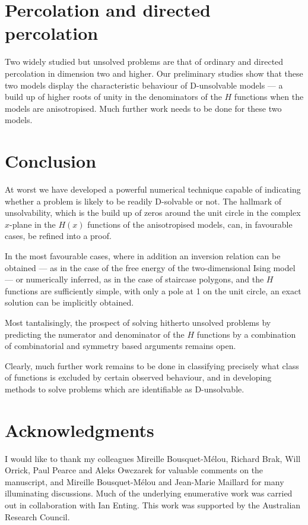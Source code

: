 \section{Percolation and directed percolation}
Two widely studied but unsolved problems are that of ordinary and
directed percolation in dimension two and higher. Our preliminary
studies \cite{JGT} show that these two models display the
characteristic behaviour of D-unsolvable models --- a build up of
higher roots of unity in the denominators of the
$H$ functions when the models
are anisotropised. Much further work needs to be done for these
two models.
\section{Conclusion}
At worst we have developed a powerful numerical technique capable
of indicating whether a problem is likely to be readily
D-solvable or not. The hallmark of unsolvability, which is
the build up of zeros around the unit circle in the
complex $x$-plane in the $H(x)$ functions of the anisotropised
models, can, in favourable cases, be refined into a proof.

In the most favourable cases, where in addition
an inversion relation can be obtained --- as in the case of
the free energy of the two-dimensional
Ising model --- or numerically inferred, as in the case of staircase
polygons, and the $H$ functions are sufficiently simple,
with only a pole at 1 on the unit circle, an exact solution
can be implicitly obtained.

Most tantalisingly, the prospect of solving hitherto unsolved
problems by predicting the numerator and denominator of the
$H$ functions by a combination of combinatorial and symmetry 
based arguments remains open.

Clearly, much further work remains to be done in classifying
precisely what class of functions is excluded by certain
observed behaviour, and in developing methods to solve problems
which are identifiable as D-unsolvable. 

\section{Acknowledgments}
I would like to thank my colleagues Mireille Bousquet-M\'elou,
Richard Brak, Will Orrick, Paul Pearce and Aleks
Owczarek for valuable comments on the manuscript, and 
Mireille Bousquet-M\'elou and Jean-Marie Maillard for many
illuminating discussions. Much of the underlying enumerative
work was carried out in collaboration with Ian Enting.
This work was supported by the Australian Research Council.

